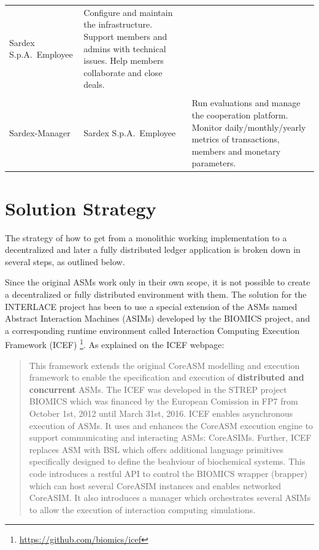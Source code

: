 {\begin{longtable}[]{@{}lll@{}}
\begin{minipage}[t]{0.25\columnwidth}Sardex S.p.A.\ Employee \end{minipage} &
\begin{minipage}[t]{0.45\columnwidth}Configure and maintain the infrastructure. Support members and admins with technical issues. Help members collaborate and close deals.\end{minipage}
\tabularnewline
\tabularnewline
\begin{minipage}[t]{0.18\columnwidth}Sardex-Manager \end{minipage} &
\begin{minipage}[t]{0.25\columnwidth}Sardex S.p.A.\ Employee \end{minipage} &
\begin{minipage}[t]{0.45\columnwidth}Run evaluations and manage the cooperation platform. Monitor daily/monthly/yearly metrics of transactions, members and monetary parameters. \end{minipage}
\tabularnewline
\bottomrule
\end{longtable}
}

\section{Solution Strategy}\label{section-solution-strategy}
The strategy of how to get from a monolithic working implementation to a decentralized and later a fully distributed ledger application is broken down in several steps, as outlined below.

Since the original ASMs work only in their own scope, it is not possible to create a decentralized or fully distributed environment with them. The solution for the INTERLACE project has been to use a special extension of the ASMs named Abstract Interaction Machines (ASIMs) developed by the BIOMICS project, and a corresponding runtime environment called Interaction Computing Execution Framework (ICEF) \footnote{\url{https://github.com/biomics/icef}}. As explained on the ICEF webpage:
\begin{quote}
\small
\vspace{-0.3cm}
This framework extends the original CoreASM modelling and execution framework to enable the specification and execution of \textbf{distributed and concurrent} ASMs. The ICEF was developed in the STREP project BIOMICS which was financed by the European Comission in FP7 from October 1st, 2012 until March 31st, 2016. ICEF enables asynchronous execution of ASMs. It uses and enhances the CoreASM execution engine to support communicating and interacting ASMs: CoreASIMs. Further, ICEF replaces ASM with BSL which offers additional language primitives specifically designed to define the beahviour of biochemical systems. This code introduces a restful API to control the BIOMICS wrapper (brapper) which can host several CoreASIM instances and enables networked CoreASIM. It also introduces a manager which orchestrates several ASIMs to allow the execution of interaction computing simulations.
\end{quote}

